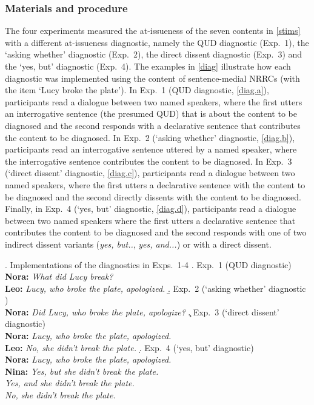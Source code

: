 \documentclass[times,linguex,xcolor]{glossa}
\begin{document}
  \subsubsection{Materials and procedure}
  
  The four experiments measured the at-issueness of the seven contents in \ref{stims} with a different at-issueness diagnostic, namely the QUD diagnostic (Exp.~1), the `asking whether' diagnostic (Exp.~2), the direct dissent diagnostic (Exp.~3) and the `yes, but' diagnostic (Exp.~4). The examples in \ref{diag} illustrate how each diagnostic was implemented using the content of sentence-medial NRRCs (with the item `Lucy broke the plate'). In Exp.~1 (QUD diagnostic, \ref{diag.a}), participants read a dialogue between two named speakers, where the first utters an interrogative sentence (the presumed QUD) that is about the content to be diagnosed and the second responds with a declarative sentence that contributes the content to be diagnosed. In Exp.~2 (`asking whether' diagnostic, \ref{diag.b}), participants read an interrogative sentence uttered by a named speaker, where the interrogative sentence contributes the content to be diagnosed. In Exp.~3 (`direct dissent' diagnostic, \ref{diag.c}), participants read a dialogue between two named speakers, where the first utters a declarative sentence with the content to be diagnosed and the second directly dissents with the content to be diagnosed. Finally, in Exp.~4 (`yes, but' diagnostic, \ref{diag.d}), participants read a dialogue between two named speakers where the first utters a declarative sentence that contributes the content to be diagnosed and the second responds with one of two indirect dissent variants (\emph{yes, but..}, \emph{yes, and...}) or with a direct dissent.

  \ex.\label{diag} Implementations of the diagnostics in Exps.~1-4
  \a.\label{diag.a} Exp.~1 (QUD diagnostic)
  \\ {\bf Nora:} \emph{What did Lucy break?}
  \\ {\bf Leo:} \emph{Lucy, who broke the plate, apologized.}
  \b.\label{diag.b} Exp.~2 (`asking whether' diagnostic )
  \\ {\bf Nora:} \emph{Did Lucy, who broke the plate, apologize?}
  \c.\label{diag.c} Exp.~3 (`direct dissent' diagnostic)
  \\ {\bf Nora:} \emph{Lucy, who broke the plate, apologized.}
  \\ {\bf Leo:} \emph{No, she didn't break the plate.}
  \d.\label{diag.d} Exp.~4 (`yes, but' diagnostic)
  \\ {\bf Nora:} \emph{Lucy, who broke the plate, apologized.}
  \\ {\bf Nina:} \emph{Yes, but she didn't break the plate.}
  \\ \hspace*{1cm} \emph{Yes, and she didn't break the plate.}
  \\ \hspace*{1cm} \emph{No, she didn't break the plate.}
\end{document}
